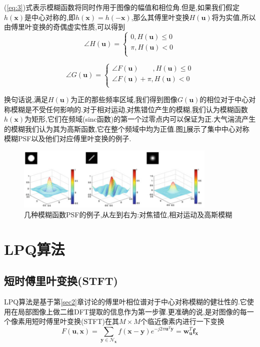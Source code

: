\documentclass[UTF8,adobefonts]{ctexart}
\begin{document}
(\ref{eq:3})式表示模糊函数将同时作用于图像的幅值和相位角.但是,如果我们假定$h(\mathbf{x})$是中心对称的,即$h(\mathbf{x})=h(\mathbf{-x})$,那么其傅里叶变换$H(\mathbf{u})$将为实值,所以由傅里叶变换的奇偶虚实性质,可以得到
  \begin{equation}\label{eq:4}
      \angle H(\mathbf{u})=      
      \left\{
       \begin{array}{l}
       0, H(\mathbf{u}) \le 0   \\
       \pi, H(\mathbf{u}) < 0  \\
       \end{array}
      \right.
      \end{equation}

 \begin{equation}\label{eq:5}
      \angle G(\mathbf{u})=      
      \left\{
       \begin{array}{l}
       \angle F(\mathbf{u})\qquad,H(\mathbf{u}) \le 0   \\
       \angle F(\mathbf{u})+\pi, H(\mathbf{u}) < 0 \\
       \end{array}
      \right.
      \end{equation}




换句话说,满足$H(\mathbf{u})$为正的那些频率区域,我们得到图像$G(\mathbf{u})$的相位对于中心对称模糊是不受任何影响的.对于相对运动,对焦错位产生的模糊,我们认为模糊函数$h(\mathbf{x})$为矩形,它们在频域(sinc函数)的第一个过零点内可以保证为正.大气湍流产生的模糊我们认为其为高斯函数,它在整个频域中均为正值.图\ref{psf}展示了集中中心对称模糊PSF以及他们对应傅里叶变换的例子. \cite{brahnam2014local}
\begin{figure}[h]
\centering
\includegraphics[height=3cm]{psf.png}

\caption{几种模糊函数PSF的例子,从左到右为:对焦错位,相对运动及高斯模糊}
\label{psf}
\end{figure}

\section{LPQ算法}
\subsection{短时傅里叶变换(STFT)}
LPQ算法是基于第\ref{sec2}章讨论的傅里叶相位谱对于中心对称模糊的健壮性的.它使用在局部图像上做二维DFT提取的信息作为第一步骤.更准确的说,是对图像的每一个像素用短时傅里叶变换(STFT)在其$M \times M$个临近像素内进行一下变换
\begin{equation}\label{eq:6}
F(\mathbf{u,x})=\sum_{\mathbf{y} \in \mathcal{N}_\mathbf{x}} f(\mathbf{x}-\mathbf{y})e^{-j2\pi \mathbf{u}^T \mathbf{y}}=\mathbf{w}^T_\mathbf{u} \mathbf{f_x}
\end{equation}
\end{document}

